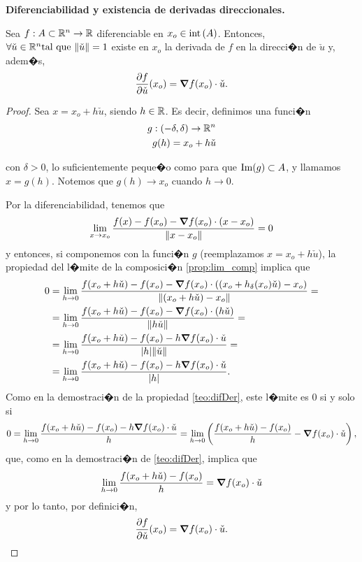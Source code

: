 \documentclass[a4paper]{scrartcl} %
\begin{document}
\begin{theorem}\textbf{Diferenciabilidad y existencia de derivadas direccionales.}\label{teo:difDir}
\mbox{}

Sea $f: A \subset \mathbb{R}^n \to \mathbb{R}$ diferenciable en $x_o \in \operatorname{int}{(A)}$. Entonces, $\forall \check{u} \in \mathbb{R}^n \text{tal que } \norm{\check{u}} = 1$ existe en $x_o$ la derivada de $f$ en la direcci�n de $\check{u}$ y, adem�s,
\[
 \frac{\partial f}{\partial \check{u}} (x_o) = \grad f (x_o) \cdot \check{u}.
\]

 \begin{proof}
 \mbox{}
 
 Sea $x = x_o + h \check{u}$, siendo $h \in \mathbb{R}$. Es decir, definimos una funci�n 
 \begin{align*}
      g & :(-\delta,\delta) \to \mathbb{R}^n \\
        & g(h) = x_o + h \check{u}
 \end{align*}

con $\delta > 0$, lo suficientemente peque�o como para que $\operatorname{Im}(g) \subset A$, y llamamos $x = g(h)$. Notemos que $g(h) \to x_o$ cuando $h \to 0$. 

Por la diferenciabilidad, tenemos que 
\[
 \lim_{x \to x_o} \frac{f(x) - f(x_o) - \grad f (x_o) \cdot (x - x_o)}
                                 {\norm{x - x_o}} = 0
\]
y entonces, si componemos con la funci�n $g$ (reemplazamos $x = x_o + h \check{u}$), la propiedad del l�mite de la composici�n \eqref{prop:lim_comp} implica que
\begin{align*}
  0 & = \lim_{h \to 0} \frac{f(x_o + h \check{u}) - f(x_o) - \grad f (x_o) \cdot ((x_o + h _{\delta}(x_o)\check{u}) - x_o) }
                    {\norm{(x_o + h \check{u}) - x_o}} = \\
    & = \lim_{h \to 0} \frac{f(x_o + h \check{u}) - f(x_o) - \grad f (x_o) \cdot (h \check{u}) }
                    {\norm{h \check{u}}} = \\
    & = \lim_{h \to 0} \frac{f(x_o + h \check{u}) - f(x_o) - h \grad f (x_o) \cdot \check{u} }
                    {\abs{h} \norm{\check{u}}} = \\
    & = \lim_{h \to 0} \frac{f(x_o + h \check{u}) - f(x_o) - h \grad f (x_o) \cdot \check{u} }
                    {\abs{h}}.  
\end{align*}                                
Como en la demostraci�n de la propiedad \eqref{teo:difDer}, este l�mite es $0$ si y solo si
\[
 0 = \lim_{h \to 0} \frac{f(x_o + h \check{u}) - f(x_o) - h \grad f (x_o) \cdot \check{u}}{h} = 
     \lim_{h \to 0} \left( \frac{f(x_o + h \check{u}) - f(x_o)}{h} - \grad f (x_o) \cdot \check{u} \right),
\]
que, como en la demostraci�n de \eqref{teo:difDer}, implica que 
\[
 \lim_{h \to 0} \frac{f(x_o + h \check{u}) - f(x_o)}{h} = \grad f (x_o) \cdot \check{u}
\]
y por lo tanto, por definici�n,
\[
 \frac{\partial f}{\partial \check{u}} (x_o) = \grad f (x_o) \cdot \check{u}.
\]
 \end{proof}
\end{theorem}
\end{document}
